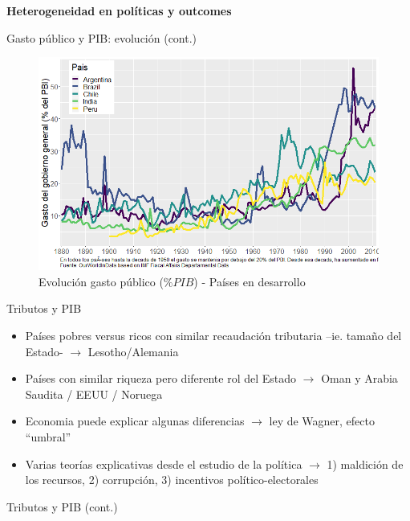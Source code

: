\documentclass[
  ignorenonframetext,
]{beamer}
\providecommand{\tightlist}{%
  \setlength{\itemsep}{0pt}\setlength{\parskip}{0pt}}\usepackage{longtable,booktabs,array}
\begin{document}
\begin{frame}{\textbf{Heterogeneidad en políticas y outcomes}}
\begin{block}{Gasto público y PIB: evolución (cont.)}
\begin{figure}
{\centering \includegraphics{../epol/fig/fig-01-003.png}

}

\caption{Evolución gasto público (\(\%PIB\)) - Países en desarrollo}

\end{figure}
\end{block}

\begin{block}{Tributos y PIB}
\protect\hypertarget{tributos-y-pib}{}
\begin{itemize}
\tightlist
\item
  Países pobres versus ricos con similar recaudación tributaria --ie.
  tamaño del Estado- \(\longrightarrow\) Lesotho/Alemania
\item
  Países con similar riqueza pero diferente rol del Estado
  \(\longrightarrow\) Oman y Arabia Saudita / EEUU / Noruega
\item
  Economia puede explicar algunas diferencias \(\longrightarrow\) ley de
  Wagner, efecto ``umbral''
\item
  Varias teorías explicativas desde el estudio de la política
  \(\longrightarrow\) 1) maldición de los recursos, 2) corrupción, 3)
  incentivos político-electorales
\end{itemize}
\end{block}

\begin{block}{Tributos y PIB (cont.)}
\protect\hypertarget{tributos-y-pib-cont.}{}
\begin{figure}


\end{figure}
\end{block}
\end{frame}
\end{document}
